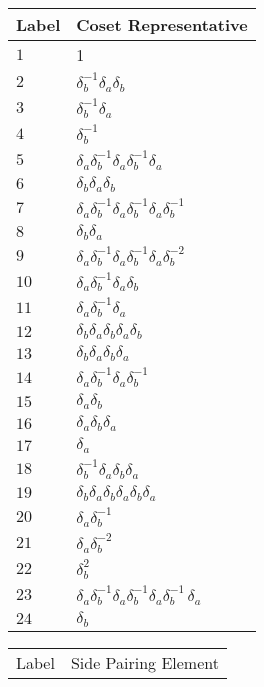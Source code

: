 \documentclass{article}
\begin{document}

\begin{center}
\begin{tabular}{ll}
\toprule
Label & Coset Representative\\
\midrule
$1$ & 1 \\
$2$ & $\delta_b^{-1}\delta_a^{}\delta_b^{}$ \\
$3$ & $\delta_b^{-1}\delta_a^{}$ \\
$4$ & $\delta_b^{-1}$ \\
$5$ & $\delta_a^{}\delta_b^{-1}\delta_a^{}\delta_b^{-1}\delta_a^{}$ \\
$6$ & $\delta_b^{}\delta_a^{}\delta_b^{}$ \\
$7$ & $\delta_a^{}\delta_b^{-1}\delta_a^{}\delta_b^{-1}\delta_a^{}\delta_b^{-1}\
$ \\
$8$ & $\delta_b^{}\delta_a^{}$ \\
$9$ & $\delta_a^{}\delta_b^{-1}\delta_a^{}\delta_b^{-1}\delta_a^{}\delta_b^{-2}\
$ \\
$10$ & $\delta_a^{}\delta_b^{-1}\delta_a^{}\delta_b^{}$ \\
$11$ & $\delta_a^{}\delta_b^{-1}\delta_a^{}$ \\
$12$ & $\delta_b^{}\delta_a^{}\delta_b^{}\delta_a^{}\delta_b^{}$ \\
$13$ & $\delta_b^{}\delta_a^{}\delta_b^{}\delta_a^{}$ \\
$14$ & $\delta_a^{}\delta_b^{-1}\delta_a^{}\delta_b^{-1}$ \\
$15$ & $\delta_a^{}\delta_b^{}$ \\
$16$ & $\delta_a^{}\delta_b^{}\delta_a^{}$ \\
$17$ & $\delta_a^{}$ \\
$18$ & $\delta_b^{-1}\delta_a^{}\delta_b^{}\delta_a^{}$ \\
$19$ & $\delta_b^{}\delta_a^{}\delta_b^{}\delta_a^{}\delta_b^{}\delta_a^{}$ \\
$20$ & $\delta_a^{}\delta_b^{-1}$ \\
$21$ & $\delta_a^{}\delta_b^{-2}$ \\
$22$ & $\delta_b^{2}$ \\
$23$ & $\delta_a^{}\delta_b^{-1}\delta_a^{}\delta_b^{-1}\delta_a^{}\delta_b^{-1\
}\delta_a^{}$ \\
$24$ & $\delta_b^{}$ \\
\bottomrule
\end{tabular}
\hfill
\begin{tabular}{ll}
\toprule
Label & Side Pairing Element\\

\end{tabular}
\end{center}
\end{document}
